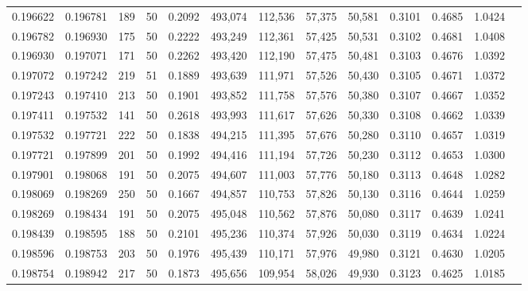 \begin{tabular}{rrrrrrrrrrrrr}
0.196622 & 0.196781 &   189 &  50 &                                     0.2092 & 493,074 & 112,536 &  57,375 &  50,581 & 0.3101 & 0.4685 & 1.0424 \\
0.196782 & 0.196930 &   175 &  50 &                                     0.2222 & 493,249 & 112,361 &  57,425 &  50,531 & 0.3102 & 0.4681 & 1.0408 \\
0.196930 & 0.197071 &   171 &  50 &                                     0.2262 & 493,420 & 112,190 &  57,475 &  50,481 & 0.3103 & 0.4676 & 1.0392 \\
0.197072 & 0.197242 &   219 &  51 &                                     0.1889 & 493,639 & 111,971 &  57,526 &  50,430 & 0.3105 & 0.4671 & 1.0372 \\
0.197243 & 0.197410 &   213 &  50 &                                     0.1901 & 493,852 & 111,758 &  57,576 &  50,380 & 0.3107 & 0.4667 & 1.0352 \\
0.197411 & 0.197532 &   141 &  50 &                                     0.2618 & 493,993 & 111,617 &  57,626 &  50,330 & 0.3108 & 0.4662 & 1.0339 \\
0.197532 & 0.197721 &   222 &  50 &                                     0.1838 & 494,215 & 111,395 &  57,676 &  50,280 & 0.3110 & 0.4657 & 1.0319 \\
0.197721 & 0.197899 &   201 &  50 &                                     0.1992 & 494,416 & 111,194 &  57,726 &  50,230 & 0.3112 & 0.4653 & 1.0300 \\
0.197901 & 0.198068 &   191 &  50 &                                     0.2075 & 494,607 & 111,003 &  57,776 &  50,180 & 0.3113 & 0.4648 & 1.0282 \\
0.198069 & 0.198269 &   250 &  50 &                                     0.1667 & 494,857 & 110,753 &  57,826 &  50,130 & 0.3116 & 0.4644 & 1.0259 \\
0.198269 & 0.198434 &   191 &  50 &                                     0.2075 & 495,048 & 110,562 &  57,876 &  50,080 & 0.3117 & 0.4639 & 1.0241 \\
0.198439 & 0.198595 &   188 &  50 &                                     0.2101 & 495,236 & 110,374 &  57,926 &  50,030 & 0.3119 & 0.4634 & 1.0224 \\
0.198596 & 0.198753 &   203 &  50 &                                     0.1976 & 495,439 & 110,171 &  57,976 &  49,980 & 0.3121 & 0.4630 & 1.0205 \\
0.198754 & 0.198942 &   217 &  50 &                                     0.1873 & 495,656 & 109,954 &  58,026 &  49,930 & 0.3123 & 0.4625 & 1.0185 \\

\end{tabular}
